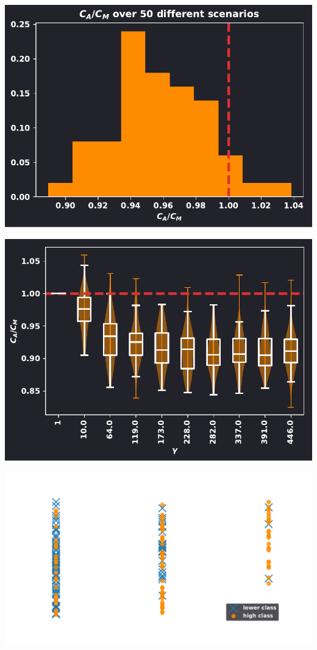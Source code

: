 \documentclass{beamer}
\begin{document}
\begin{frame}[fragile]
    \begin{center}
        \includegraphics[width=.7\textwidth]{static/ratio_one_to_twenty.pdf}
    \end{center}
\end{frame}

\begin{frame}[fragile]
    \begin{center}
    \includegraphics[width=.7\textwidth]{static/ratio_over_gammas.pdf}
    \end{center}
\end{frame}


\begin{frame}[fragile]
    \begin{center}
    \includegraphics[width=.7\textwidth]{static/exit_levels.pdf}
    \end{center}
\end{frame}
\end{document}
